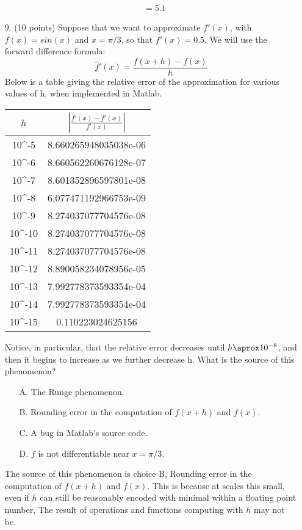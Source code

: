 \documentclass{article}
\begin{document}
\begin{enumerate}
\begin{align*}
        &= 5.1
    \end{align*}
    \newpage
    \item[9.] (10 points) Suppose that we want to approximate $f'(x)$, with $f(x) = sin(x)$ and $x = \pi/3$, so that $f'(x) = 0.5$.\newline
    We will use the forward difference formula:
    \[\hat{f}'(x)=\frac{f(x+h)-f(x)}{h}\]
    Below is a table giving the relative error of the approximation for various values of h, when implemented in Matlab.\newline\newline
    \begin{tabular}{ c|c } 
        $h$ & $\left|\frac{f'(x) - \hat{f}'(x)}{f'(x)}\right|$ \\ 
        \hline
        10^{-5} & 8.660265948035038e-06\\
        10^{-6} & 8.660562260676128e-07\\
        10^{-7} & 8.601352896597801e-08\\
        10^{-8} & 6.077471192966753e-09\\
        10^{-9} & 8.274037077704576e-08\\
        10^{-10} & 8.274037077704576e-08\\
        10^{-11} & 8.274037077704576e-08\\
        10^{-12} & 8.890058234078956e-05\\
        10^{-13} & 7.992778373593354e-04\\
        10^{-14} & 7.992778373593354e-04\\
        10^{-15} & 0.110223024625156\\
    \end{tabular}\newline
    Notice, in particular, that the relative error decreases until $h \aprox 10^{-8}$, and then it begins to increase as we further decrease h. What is the source of this phenomenon?
    \begin{enumerate}
        \item[A.] The Runge phenomenon.
        \item[B.] Rounding error in the computation of $f(x + h)$ and $f(x)$.
        \item[C.] A bug in Matlab’s source code.
        \item[D.] $f$ is not differentiable near $x = \pi/3$.
    \end{enumerate}
    \newline
    \newline
    The source of this phenomenon is choice B, Rounding error in the computation of $f(x + h)$ and $f(x)$. This is because at scales this small, even if $h$ can still be reasonably encoded with minimal within a floating point number, The result of operations and functions computing with $h$ may not be.   
\end{enumerate}
\end{document}
